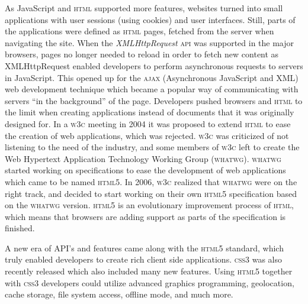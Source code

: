 \documentclass[a4paper,11pt]{kth-mag}
\begin{document}
        As JavaScript and \textsc{html} supported more features, websites turned into small applications with user sessions (using cookies) and user interfaces.
        Still, parts of the applications were defined as \textsc{html} pages, fetched from the server when navigating the site.
        When the \emph{XMLHttpRequest} \textsc{api} was supported in the major browsers, pages no longer needed to reload in order to fetch new content as XMLHttpRequest enabled developers to perform asynchronous requests to servers in JavaScript.
        This opened up for the \textsc{ajax} (Asynchronous JavaScript and XML) web development technique which became a popular way of communicating with servers ``in the background'' of the page.
        Developers pushed browsers and \textsc{html} to the limit when creating applications instead of documents that it was originally designed for.
        In a \textsc{w3c} meeting in 2004 it was proposed to extend \textsc{html} to ease the creation of web applications, which was rejected.
        \textsc{w3c} was criticized of not listening to the need of the industry, and some members of \textsc{w3c} left to create the Web Hypertext Application Technology Working Group (\textsc{whatwg}).
        \textsc{whatwg} started working on specifications to ease the development of web applications which came to be named \textsc{html5}.
        In 2006, \textsc{w3c} realized that \textsc{whatwg} were on the right track, and decided to start working on their own \textsc{html5} specification based on the \textsc{whatwg} version.
        \textsc{html5} is an evolutionary improvement process of \textsc{html}, which means that browsers are adding support as parts of the specification is finished.

        A new era of \textsc{API}'s and features came along with the \textsc{html5} standard, which truly enabled developers to create rich client side applications.
        \textsc{css3} was also recently released which also included many new features.
        Using \textsc{html5} together with \textsc{css3} developers could utilize advanced graphics programming, geolocation, cache storage, file system access, offline mode, and much more.

\end{document}
